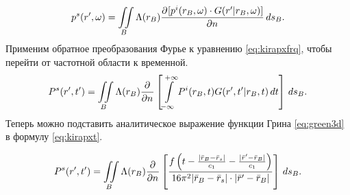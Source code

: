\documentclass[a4paper, fontsize=14pt]{article}
\begin{document}
	\begin{equation}
		p^s(r',\omega)= \iint\limits_B \Lambda(r_B) \frac{\partial ^ {  } [p^i(r_B,\omega)\cdot G(r'|r_B,\omega)]}{\partial n ^ {  } } \,ds_B.
		\label{eq:kirapxfrq}
	\end{equation}
	Применим обратное преобразования Фурье к уравнению \ref{eq:kirapxfrq}, чтобы перейти от частотной области к временной.
	\begin{equation}
			P^s(r',t')= \iint\limits_B \Lambda(r_B) \frac{\partial ^ {  } }{\partial n ^ {  } } \left[\int\limits_{-\infty}^{+\infty}P^i(r_B,t)G(r',t'|r_B,t)\,dt\right]\,ds_B.
			\label{eq:kirapxt}
	\end{equation} 
	Теперь можно подставить аналитическое выражение функции Грина \ref{eq:green3d} в формулу \ref{eq:kirapxt}.\cite{fomel}
	
	\begin{equation}
		P^s(r',t')= \iint\limits_B \Lambda(r_B) \frac{\partial ^ {  } }{\partial n ^ {  } } \left[\frac{f\left(t - \frac{|\bar{r}_B-\bar{r}_s|}{c_1} -\frac{|\bar{r}'-\bar{r}_B|}{c_1} \right)}{16\pi^2|\bar{r}_B-\bar{r}_s|\cdot |\bar{r}'-\bar{r}_B|}\right]\,ds_B.
		\label{eq:kirapxgt}
	\end{equation} 
\end{document}
